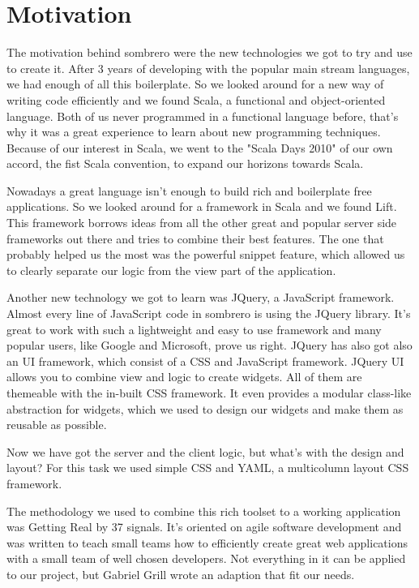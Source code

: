 \section{Motivation}
The motivation behind sombrero were the new technologies we got to try and use to create it. After 3 years of developing with the popular main stream languages, we had enough of all this boilerplate. So we looked around for a new way of writing code efficiently and we found Scala, a functional and object-oriented language. Both of us never programmed in a functional language before, that's why it was a great experience to learn about new programming techniques. Because of our interest in Scala, we went to the "Scala Days 2010" of our own accord, the fist Scala convention, to expand our horizons towards Scala.


Nowadays a great language isn't enough to build rich and boilerplate free applications. So we looked around for a framework in Scala and we found Lift. This framework borrows ideas from all the other great and popular server side frameworks out there and tries to combine their best features. The one that probably helped us the most was the powerful snippet feature, which allowed us to clearly separate our logic from the view part of the application.

Another new technology we got to learn was JQuery, a JavaScript framework. Almost every line of JavaScript code in sombrero is using the JQuery library. It's great to work with such a lightweight and easy to use framework and many popular users, like Google and Microsoft, prove us right. JQuery has also got also an UI framework, which consist of a CSS and JavaScript framework. JQuery UI allows you to combine view and logic to create widgets. All of them are themeable with the in-built CSS framework. It even provides a modular class-like abstraction for widgets, which we used to design our widgets and make them as reusable as possible.

Now we have got the server and the client logic, but what's with the design and layout? For this task we used simple CSS and YAML, a multicolumn layout CSS framework.

The  methodology we used to combine this rich toolset to a working application was Getting Real by 37 signals. It's oriented on agile software development and was written to teach small teams how to efficiently create great web applications with a small team of well chosen developers. Not everything in it can be applied to our project, but Gabriel Grill wrote an adaption that fit our needs.

